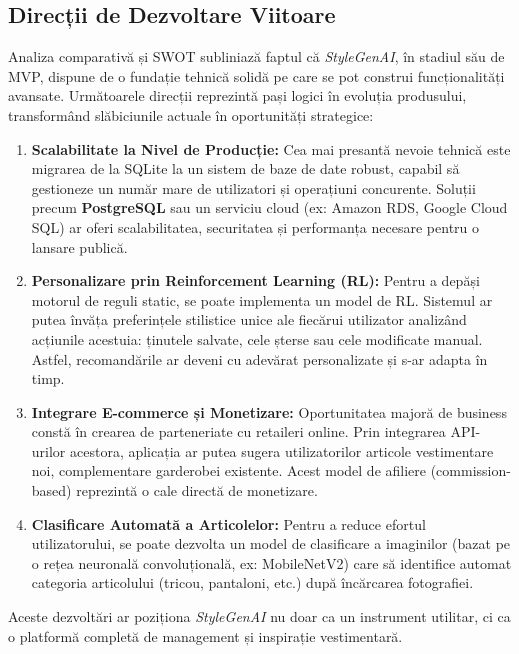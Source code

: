 \subsection{Direcții de Dezvoltare Viitoare}
\label{ssec:directii_viitoare}

Analiza comparativă și SWOT subliniază faptul că \textit{StyleGenAI}, în stadiul său de MVP, dispune de o fundație tehnică solidă pe care se pot construi funcționalități avansate. Următoarele direcții reprezintă pași logici în evoluția produsului, transformând slăbiciunile actuale în oportunități strategice:

\begin{enumerate}
    \item \textbf{Scalabilitate la Nivel de Producție:} Cea mai presantă nevoie tehnică este migrarea de la SQLite la un sistem de baze de date robust, capabil să gestioneze un număr mare de utilizatori și operațiuni concurente. Soluții precum \textbf{PostgreSQL} sau un serviciu cloud (ex: Amazon RDS, Google Cloud SQL) ar oferi scalabilitatea, securitatea și performanța necesare pentru o lansare publică.

    \item \textbf{Personalizare prin Reinforcement Learning (RL):} Pentru a depăși motorul de reguli static, se poate implementa un model de RL. Sistemul ar putea învăța preferințele stilistice unice ale fiecărui utilizator analizând acțiunile acestuia: ținutele salvate, cele șterse sau cele modificate manual. Astfel, recomandările ar deveni cu adevărat personalizate și s-ar adapta în timp.

    \item \textbf{Integrare E-commerce și Monetizare:} Oportunitatea majoră de business constă în crearea de parteneriate cu retaileri online. Prin integrarea API-urilor acestora, aplicația ar putea sugera utilizatorilor articole vestimentare noi, complementare garderobei existente. Acest model de afiliere (commission-based) reprezintă o cale directă de monetizare.
    
    \item \textbf{Clasificare Automată a Articolelor:} Pentru a reduce efortul utilizatorului, se poate dezvolta un model de clasificare a imaginilor (bazat pe o rețea neuronală convoluțională, ex: MobileNetV2) care să identifice automat categoria articolului (tricou, pantaloni, etc.) după încărcarea fotografiei.
\end{enumerate}

Aceste dezvoltări ar poziționa \textit{StyleGenAI} nu doar ca un instrument utilitar, ci ca o platformă completă de management și inspirație vestimentară.


